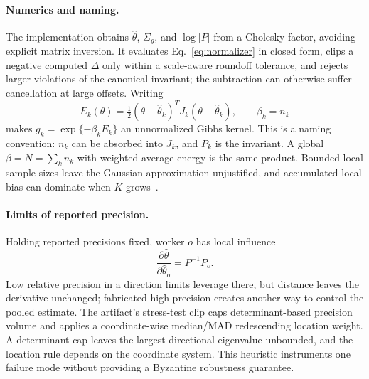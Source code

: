 \paragraph{Numerics and naming.}
The implementation obtains $\hat\theta$, $\Sigma_g$, and $\log|P|$ from a Cholesky factor,
avoiding explicit matrix inversion. It evaluates Eq.~\eqref{eq:normalizer} in closed form, clips a
negative computed $\Delta$ only within a scale-aware roundoff tolerance, and rejects larger
violations of the canonical invariant; the subtraction can otherwise suffer cancellation at
large offsets. Writing
\begin{equation}
E_k(\theta)=\tfrac12(\theta-\hat\theta_k)^TJ_k(\theta-\hat\theta_k),
\qquad \beta_k=n_k
\label{eq:gibbs}
\end{equation}
makes $g_k=\exp\{-\beta_kE_k\}$ an unnormalized Gibbs kernel. This is a naming convention:
$n_k$ can be absorbed into $J_k$, and $P_k$ is the invariant. A global
$\beta=N=\sum_kn_k$ with weighted-average energy is the same product. Bounded local sample sizes
leave the Gaussian approximation unjustified, and accumulated local bias can dominate when $K$
grows~\cite{zhang2013oneshot,zhou2017raocd}.

\paragraph{Limits of reported precision.}
Holding reported precisions fixed, worker $o$ has local influence
\begin{equation}
\frac{\partial\hat\theta}{\partial\hat\theta_o}=P^{-1}P_o.
\label{eq:influence}
\end{equation}
Low relative precision in a direction limits leverage there, but distance leaves the derivative
unchanged; fabricated high precision creates another way to control the pooled estimate. The
artifact's stress-test clip caps determinant-based precision volume and applies a coordinate-wise median/MAD
redescending location weight. A determinant cap leaves the largest directional eigenvalue
unbounded, and the location rule depends on the coordinate system. This heuristic instruments
one failure mode without providing a Byzantine robustness guarantee.

